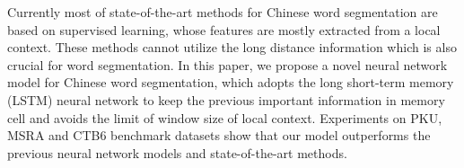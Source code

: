 Currently most of state-of-the-art methods for Chinese word segmentation are based on supervised learning, whose features are mostly extracted from a local context. These methods cannot utilize the long distance information which is also crucial for word segmentation. In this paper, we propose a novel neural network model for Chinese word segmentation, which adopts the long short-term memory (LSTM) neural network to keep the previous important information in memory cell and avoids the limit of window size of local context. Experiments on PKU, MSRA and CTB6 benchmark datasets show that our model outperforms the previous neural network models and state-of-the-art methods.
